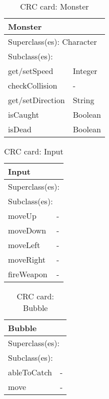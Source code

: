 \begin{table}[]
\centering
\label{crc_monster}
\begin{tabular}{|l|l|}
\hline
\multicolumn{2}{|l|}{Monster} \\ \hline
\multicolumn{2}{|l|}{Superclass(es): Character} \\ \hline
\multicolumn{2}{|l|}{Subclass(es):} \\ \hline
get/setSpeed            & Integer \\ \hline
checkCollision          & -\\ \hline
get/setDirection        & String\\ \hline
isCaught                & Boolean \\ \hline
isDead                  & Boolean \\ \hline
\end{tabular}
\caption{CRC card: Monster}
\end{table}

\begin{table}[]
\centering
\label{crc_input}
\begin{tabular}{|l|l|}
\hline
\multicolumn{2}{|l|}{Input} \\ \hline
\multicolumn{2}{|l|}{Superclass(es):} \\ \hline
\multicolumn{2}{|l|}{Subclass(es):} \\ \hline
moveUp          & -\\ \hline
moveDown        & - \\ \hline
moveLeft        & -\\ \hline
moveRight       & -\\ \hline
fireWeapon      & - \\ \hline
\end{tabular}
\caption{CRC card: Input}
\end{table}

\begin{table}[]
\centering
\label{crc_bubble}
\begin{tabular}{|l|l|}
\hline
\multicolumn{2}{|l|}{Bubble} \\ \hline
\multicolumn{2}{|l|}{Superclass(es):} \\ \hline
\multicolumn{2}{|l|}{Subclass(es):} \\ \hline
ableToCatch           & - \\ \hline
move           & -\\ \hline
\end{tabular}
\caption{CRC card: Bubble}
\end{table}


